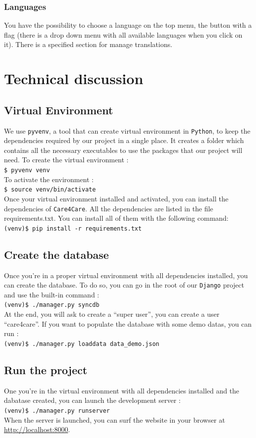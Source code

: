 \documentclass[11pt, a4paper]{article}   	%
\newcommand{\shellcmd}[1]{\\\indent\indent\texttt{\footnotesize\$ #1}\\}
\newcommand{\vshellcmd}[1]{\\\indent\indent\texttt{\footnotesize(venv)\$ #1}\\}
\begin{document}
\subsubsection{Languages}

You have the possibility to choose a language on the top menu, the button with a flag (there is a drop down menu with all available languages when you click on it). There is a specified section for manage translations.



\section{Technical discussion}

\subsection{Virtual Environment}

We use \texttt{pyvenv}, a tool that can create virtual environment in \texttt{Python}, to keep the dependencies required by our project in a single place. It creates a folder which contains all the necessary executables to use the packages that our project will need. To create the virtual environment :
\shellcmd{pyvenv venv}
To activate the environment :
\shellcmd{source venv/bin/activate}
Once your virtual environment installed and activated, you can install the dependencies of \texttt{Care4Care}. All the dependencies are listed in the file requirements.txt. You can install all of them with the following command:
\vshellcmd{pip install -r requirements.txt}

\subsection{Create the database}
Once you're in a proper virtual environment with all dependencies installed, you can create the database. To do so, you can go in the root of our \texttt{Django} project and use the built-in command :
\vshellcmd{./manager.py syncdb}
At the end, you will ask to create a ``super user'', you can create a user ``care4care''. If you want to populate the database with some demo datas, you can run :
\vshellcmd{./manager.py loaddata data\_demo.json}

\subsection{Run the project}
One you're in the virtual environment with all dependencies installed and the dabatase created, you can launch the development server :
\vshellcmd{./manager.py runserver}
When the server is launched, you can surf the website in your browser at \url{http://localhost:8000}. 
\end{document}
